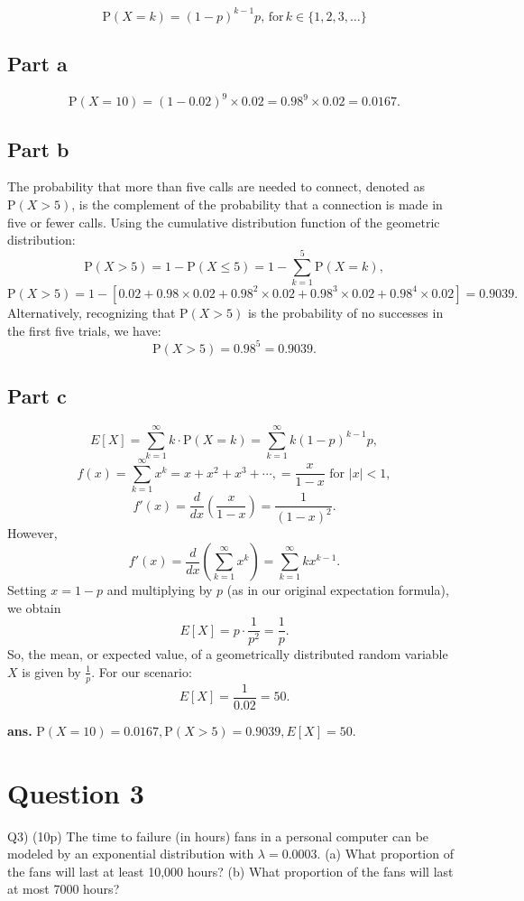 \documentclass[12pt]{article}
\begin{document}
\[ \mathrm{P}(X = k) = (1 - p)^{k-1} p, \, \text{for} \, k \in \{1, 2, 3, \ldots\}\]

\subsection*{Part a}

\[ \mathrm{P}(X = 10) = (1 - 0.02)^9 \times 0.02 = 0.98^9 \times 0.02 = 0.0167. \]
\AnswerTag
\subsection*{Part b}

The probability that more than five calls are needed to connect, denoted as \( \mathrm{P}(X > 5) \), is the complement of the probability that a connection is made in five or fewer calls. Using the cumulative distribution function of the geometric distribution: \[ \mathrm{P}(X > 5) = 1 - \mathrm{P}(X \leq 5) = 1 - \sum_{k=1}^{5} \mathrm{P}(X = k), \] \[ \mathrm{P}(X > 5) = 1 - [0.02 + 0.98 \times 0.02 + 0.98^2 \times 0.02 + 0.98^3 \times 0.02 + 0.98^4 \times 0.02] = 0.9039. \] Alternatively, recognizing that \( \mathrm{P}(X > 5) \) is the probability of no successes in the first five trials, we have: \[ \mathrm{P}(X > 5) = 0.98^5 = 0.9039. \]
\AnswerTag
\subsection*{Part c}

\[ E[X] = \sum_{k=1}^{\infty} k \cdot \mathrm{P}(X = k) = \sum_{k=1}^{\infty} k (1 - p)^{k-1} p, \] \[ f(x) = \sum_{k=1}^{\infty} x^k = x + x^2 + x^3 + \cdots, = \frac{x}{1 - x} \text{ for } |x| < 1 ,\] \[ f'(x) = \frac{d}{dx}\left(\frac{x}{1 - x}\right) = \frac{1}{(1 - x)^2}. \] However, \[ f'(x) = \frac{d}{dx}\left( \sum_{k=1}^{\infty} x^k \right) = \sum_{k=1}^{\infty} k x^{k-1}. \] Setting \( x = 1 - p \) and multiplying by \( p \) (as in our original expectation formula), we obtain \[ E[X] = p \cdot \frac{1}{p^2} = \frac{1}{p}. \] So, the mean, or expected value, of a geometrically distributed random variable \( X \) is given by \( \frac{1}{p} \). For our scenario: \[ E[X] = \frac{1}{0.02} = 50. \]
\AnswerTag


\vfill
\begin{flushright}
\textbf{ans.} \( \mathrm{P}(X = 10) = 0.0167, \mathrm{P}(X > 5) = 0.9039,  E[X] = 50.\)
\end{flushright}

\newpage
\section*{Question 3}
\begin{q}
Q3) (10p) The time to failure (in hours) fans in a personal computer can be modeled by an exponential distribution with \(\lambda=0.0003\).
(a) What proportion of the fans will last at least 10,000 hours?
(b) What proportion of the fans will last at most 7000 hours?
\end{q}
\end{document}
